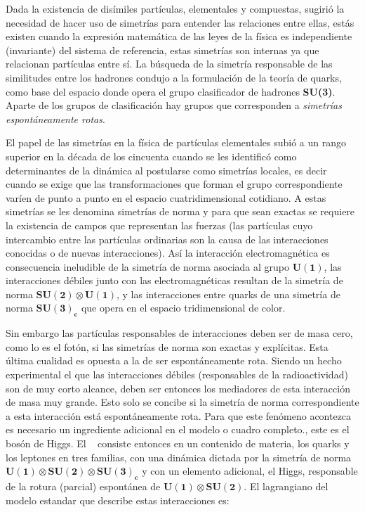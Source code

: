 
Dada la existencia de disímiles partículas, elementales y compuestas, sugirió la necesidad de hacer uso de simetrías para entender las relaciones entre ellas, estás existen cuando la expresión matemática de las leyes de la física es independiente (invariante) del sistema de referencia, estas simetrías son internas ya que relacionan partículas entre sí. La búsqueda de la simetría responsable de las similitudes entre los hadrones condujo a la formulación de la teoría de quarks, como base del espacio donde opera el grupo clasificador de hadrones \textbf{SU(3)}. Aparte de los grupos de clasificación hay grupos que corresponden a \textit{simetrías espontáneamente rotas}. 

El papel de las simetrías  en la física de partículas elementales subió a un rango superior en la década de los cincuenta cuando se les identificó  como determinantes de la dinámica al postularse como simetrías locales, es decir cuando se exige que las transformaciones que forman el grupo correspondiente varíen de punto a punto en el espacio cuatridimensional cotidiano. A estas simetrías se les denomina simetrías de norma y para que sean exactas se requiere la existencia de campos que representan las fuerzas (las partículas cuyo intercambio entre las partículas ordinarias son la causa de las interacciones conocidas o de nuevas interacciones). Así la interacción electromagnética es consecuencia ineludible de la simetría de norma asociada al grupo $\mathbf{U(1)}$, las interacciones débiles junto con las electromagnéticas resultan de la simetría de norma $\mathbf{SU(2) \otimes U(1)}$, y las interacciones entre quarks de una simetría de norma $\mathbf{SU(3)_c}$ que opera en el espacio tridimensional de color.
    
Sin embargo las partículas responsables de interacciones deben ser de masa cero, como lo es el fotón,  si las simetrías de norma son exactas y explícitas. Esta última cualidad es opuesta a la de ser espontáneamente rota. Siendo un hecho experimental el que las interacciones débiles (responsables de la radioactividad) son de muy corto alcance, deben ser entonces los mediadores de esta interacción de masa muy grande. Esto solo se concibe si la simetría de norma correspondiente a esta interacción está espontáneamente rota. Para que este fenómeno acontezca es necesario un ingrediente adicional en el modelo o cuadro completo., este es el bosón de Higgs. El \ME ~ consiste entonces en un contenido de materia, los quarks y los leptones en tres familias, con una dinámica dictada por la simetría de norma $\mathbf{U(1) \otimes SU(2) \otimes SU(3)_c}$ y con un elemento adicional, el Higgs, responsable de la rotura (parcial) espontánea de  $\mathbf{U(1) \otimes SU(2)}$. El lagrangiano del modelo estandar que describe estas interacciones es:

